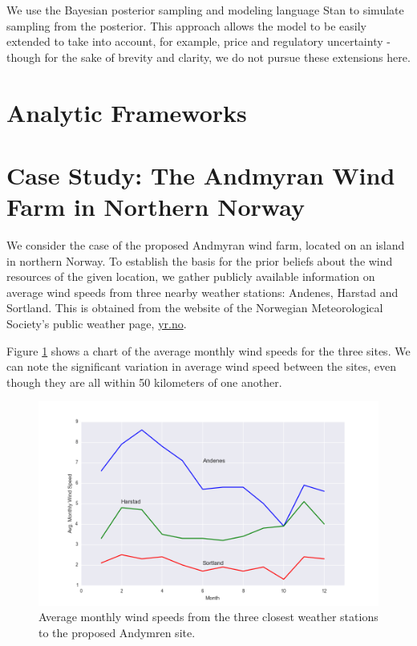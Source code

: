 \documentclass[11pt]{article}
\begin{document}
We use the Bayesian posterior sampling and modeling language Stan \citep{stan_development_team_stan} to simulate sampling from the posterior. This approach allows the model to be easily extended to take into account, for example, price and regulatory uncertainty - though for the sake of brevity and clarity, we do not pursue these extensions here.


\section{Analytic Frameworks}


\section{Case Study: The Andmyran Wind Farm in Northern Norway}

We consider the case of the proposed Andmyran wind farm, located on an island in northern Norway. To establish the basis for the prior beliefs about the wind resources of the given location, we gather publicly available information on average wind speeds from three nearby weather stations: Andenes, Harstad and Sortland. This is obtained from the website of the Norwegian Meteorological Society's public weather page, \url{yr.no}. 

Figure \ref{avg_wind_speed_data} shows a chart of the average monthly wind speeds for the three sites. We can note the significant variation in average wind speed between the sites, even though they are all within 50 kilometers of one another. 

\begin{figure}
	\includegraphics[width=1\textwidth]{figures/avg_wind_speed_data.png}
	\caption{Average monthly wind speeds from the three closest weather stations to the proposed Andymren site.}
	\label{avg_wind_speed_data}
\end{figure}
\end{document}
